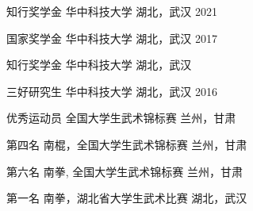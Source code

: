 


\vspace{-1.5mm}
\begin{cvhonors}

\cvhonor
{知行奖学金} %
{华中科技大学} %
{湖北，武汉} %
{2021} %

\cvhonor
{国家奖学金} %
{华中科技大学} %
{湖北，武汉} %
{2017} %

\cvhonor
{知行奖学金} %
{华中科技大学} %
{湖北，武汉} %
{} %


\cvhonor
{三好研究生} %
{华中科技大学} %
{湖北，武汉} %
{2016} %




\cvhonor
{优秀运动员} %
{全国大学生武术锦标赛} %
{兰州，甘肃} %
{ } %


\cvhonor
{第四名} %
{南棍，全国大学生武术锦标赛} %
{兰州，甘肃} %
{ } %


\cvhonor
{第六名} %
{南拳, 全国大学生武术锦标赛} %
{兰州，甘肃} %
{ } %


\cvhonor
{第一名} %
{南拳，湖北省大学生武术比赛} %
{湖北，武汉} %
{ } %


\end{cvhonors}
